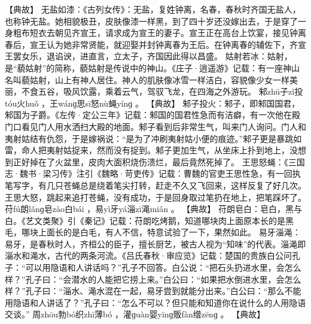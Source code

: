 \documentclass[12pt,UTF8]{ctexbook}
\begin{document}
【典故】
无盐如漆：《古列女传》：无盐，复姓钟离，名春，春秋时齐国无盐人，也称钟无盐。她相貌极丑，皮肤像漆一样黑，到了四十岁还没嫁出去，于是穿了一身粗布短衣去朝见齐宣王，请求成为宣王的妻子。宣王正在高台上饮宴，接见钟离春后，宣王认为她非常贤能，就迎娶并封钟离春为王后。在钟离春的辅佐下，齐宣王罢女乐，退谄谀，进直言，立太子，齐国因此得以昌盛。
姑射若冰：姑射，是“藐姑射”的简称，藐姑射是传说中的神山。《庄子·逍遥游》记载：有一座神山名叫藐姑射，山上有神人居住。神人的肌肤像冰雪一样洁白，容貌像少女一样美丽，不食五谷，吸风饮露，乘着云气，驾驭飞龙，在四海之外游玩。
邾zhū子zǐ投tóu火huǒ
，王wánɡ思sī怒nù蝇yínɡ
。
【典故】
邾子投火：邾子，即邾国国君，邾国为子爵。《左传·定公三年》记载：邾国的国君性急而有洁癖，有一次他在殿门口看见门人用水洒扫大殿的地面。邾子看到后非常生气，叫来门人询问。门人和夷射姑结有仇怨，于是嫁祸说：“是为了冲刷夷射姑小便的痕迹。”邾子更是暴跳如雷，命人把夷射姑捉来，然而没有捉到。邾子更加生气，从坐床上扑到地上，没想到正好掉在了火盆里，皮肉大面积烧伤溃烂，最后竟然死掉了。
王思怒蝇：《三国志·魏书·梁习传》注引《魏略·苛吏传》记载：曹魏的官吏王思性急，有一回执笔写字，有几只苍蝇总是绕着笔尖打转，赶走不久又飞回来，这样反复了好几次。王思大怒，跳起来追打苍蝇，没有成功，于是回身取过笔扔在地上，把笔踩坏了。
苻fú朗lǎnɡ皂zào白bái
，易yì牙yá淄zī渑miǎn
。
【典故】
苻朗皂白：皂白，黑与白。《艺文类聚》引《秦记》记载：苻朗吃烤鹅，知道哪块肉上面原本长的是黑毛，哪块上面长的是白毛，有人不信，特意试验了一下，果然如此。
易牙淄渑：易牙，是春秋时人，齐桓公的臣子，擅长厨艺，被古人视为“知味”的代表。淄渑即淄水和渑水，古代的两条河流。《吕氏春秋·审应览》记载：楚国的贵族白公问孔子：“可以用隐语和人讲话吗？”孔子不回答。白公说：“把石头扔进水里，会怎么样？”孔子曰：“会潜水的人能把它捞上来。”白公曰：“如果把水倒进水里，会怎么样？”孔子曰：“淄水、渑水混在一起，易牙尝到就能分出来。”白公曰：“那么不能用隐语和人讲话了？”孔子曰：“怎么不可以？但只能和知道你在说什么的人用隐语交谈。”
周zhōu勃bó织zhī薄bó
，灌ɡuàn婴yīnɡ贩fàn缯zēnɡ
。
【典故】
\end{document}
